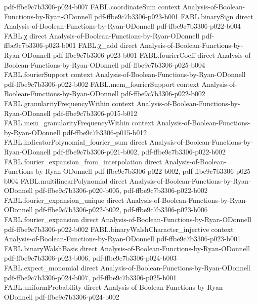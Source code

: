 \begin{theorem}
{    pdf-ffbe9c7b3306-p024-b007}
\proofstep
  {FABL.coordinateSum}
  {context}
  {Analysis-of-Boolean-Functions-by-Ryan-ODonnell}
  {pdf-ffbe9c7b3306-p023-b001}
\proofstep
  {FABL.binarySign}
  {direct}
  {Analysis-of-Boolean-Functions-by-Ryan-ODonnell}
  {pdf-ffbe9c7b3306-p022-b004}
\proofstep
  {FABL.χ}
  {direct}
  {Analysis-of-Boolean-Functions-by-Ryan-ODonnell}
  {pdf-ffbe9c7b3306-p023-b001}
\proofstep
  {FABL.χ_add}
  {direct}
  {Analysis-of-Boolean-Functions-by-Ryan-ODonnell}
  {pdf-ffbe9c7b3306-p023-b001}
\proofstep
  {FABL.fourierCoeff}
  {direct}
  {Analysis-of-Boolean-Functions-by-Ryan-ODonnell}
  {pdf-ffbe9c7b3306-p025-b004}
\proofstep
  {FABL.fourierSupport}
  {context}
  {Analysis-of-Boolean-Functions-by-Ryan-ODonnell}
  {pdf-ffbe9c7b3306-p022-b002}
\proofstep
  {FABL.mem_fourierSupport}
  {context}
  {Analysis-of-Boolean-Functions-by-Ryan-ODonnell}
  {pdf-ffbe9c7b3306-p022-b002}
\proofstep
  {FABL.granularityFrequencyWithin}
  {context}
  {Analysis-of-Boolean-Functions-by-Ryan-ODonnell}
  {pdf-ffbe9c7b3306-p015-b012}
\proofstep
  {FABL.mem_granularityFrequencyWithin}
  {context}
  {Analysis-of-Boolean-Functions-by-Ryan-ODonnell}
  {pdf-ffbe9c7b3306-p015-b012}
\proofstep
  {FABL.indicatorPolynomial_fourier_sum}
  {direct}
  {Analysis-of-Boolean-Functions-by-Ryan-ODonnell}
  {pdf-ffbe9c7b3306-p021-b002,
    pdf-ffbe9c7b3306-p022-b002}
\proofstep
  {FABL.fourier_expansion_from_interpolation}
  {direct}
  {Analysis-of-Boolean-Functions-by-Ryan-ODonnell}
  {pdf-ffbe9c7b3306-p022-b002,
    pdf-ffbe9c7b3306-p025-b004}
\proofstep
  {FABL.multilinearPolynomial}
  {direct}
  {Analysis-of-Boolean-Functions-by-Ryan-ODonnell}
  {pdf-ffbe9c7b3306-p020-b005,
    pdf-ffbe9c7b3306-p022-b002}
\proofstep
  {FABL.fourier_expansion_unique}
  {direct}
  {Analysis-of-Boolean-Functions-by-Ryan-ODonnell}
  {pdf-ffbe9c7b3306-p022-b002,
    pdf-ffbe9c7b3306-p023-b006}
\proofstep
  {FABL.fourier_expansion}
  {direct}
  {Analysis-of-Boolean-Functions-by-Ryan-ODonnell}
  {pdf-ffbe9c7b3306-p022-b002}
\proofstep
  {FABL.binaryWalshCharacter_injective}
  {context}
  {Analysis-of-Boolean-Functions-by-Ryan-ODonnell}
  {pdf-ffbe9c7b3306-p023-b001}
\proofstep
  {FABL.binaryWalshBasis}
  {direct}
  {Analysis-of-Boolean-Functions-by-Ryan-ODonnell}
  {pdf-ffbe9c7b3306-p023-b006,
    pdf-ffbe9c7b3306-p024-b003}
\proofstep
  {FABL.expect_monomial}
  {direct}
  {Analysis-of-Boolean-Functions-by-Ryan-ODonnell}
  {pdf-ffbe9c7b3306-p024-b007,
    pdf-ffbe9c7b3306-p025-b001}
\proofstep
  {FABL.uniformProbability}
  {direct}
  {Analysis-of-Boolean-Functions-by-Ryan-ODonnell}
  {pdf-ffbe9c7b3306-p024-b002}

\end{theorem}
